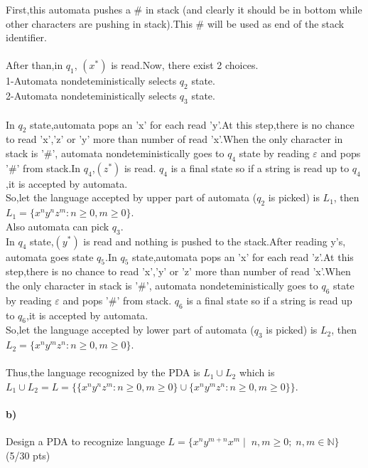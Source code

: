 \documentclass[a4paper,12pt]{article}
\begin{document}
\begin{tcolorbox}

First,this automata pushes a \# in stack (and clearly it should be in bottom while other characters are pushing in stack).This \# will be used as end of the stack identifier.\\\\
After than,in $q_1$, $(x^*)$ is read.Now, there exist 2 choices.\\
1-Automata nondeteministically selects $q_2$ state.\\ 
2-Automata nondeteministically selects $q_3$ state.\\\\
In $q_2$ state,automata pops an 'x' for each read 'y'.At this step,there is no chance to read 'x','z' or 'y' more than number of read 'x'.When the only character in stack is '\#', automata nondeteministically goes to $q_4$ state by reading $\varepsilon$ and pops '\#' from stack.In $q_4$,$(z^*)$ is read. $q_4$ is a final state so if a string is read up to $q_4$,it is accepted by automata.\\
So,let the language accepted by upper part of automata ($q_2$ is picked) is $L_1$, then $L_1=\{x^ny^nz^m:n \geq 0,m \geq 0\}$.\\Also automata can pick $q_3$.\\
In $q_4$ state,$(y^*)$ is read and nothing is pushed to the stack.After reading y's, automata goes state $q_5$.In $q_5$ state,automata pops an 'x' for each read 'z'.At this step,there is no chance to read 'x','y' or 'z' more than number of read 'x'.When the only character in stack is '\#', automata nondeteministically goes to $q_6$ state by reading $\varepsilon$ and pops '\#' from stack. $q_6$ is a final state so if a string is read up to $q_6$,it is accepted by automata.\\
So,let the language accepted by lower part of automata ($q_3$ is picked) is $L_2$, then $L_2=\{x^ny^mz^n:n \geq 0,m \geq 0\}$.\\\\ 
Thus,the language recognized by the PDA is $L_1 \cup L_2$ which is $L_1 \cup L_2=L=\{\{x^ny^nz^m:n \geq 0,m \geq 0\} \cup \{x^ny^mz^n:n \geq 0,m \geq 0\}\}$.

\end{tcolorbox}

\newpage

\paragraph{b)} 
Design a PDA to recognize language $ L=\{x^n y^{m+n} x^m \mid \; n,m \geq 0; \; n,m \in \mathbb{N}  \} $  \hfill \small{(5/30 pts)} \\
\end{document}
